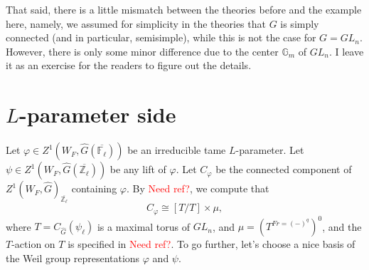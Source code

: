 That said, there is a little mismatch between the theories before and the example here, namely, we assumed for simplicity in the theories that $G$ is simply connected (and in particular, semisimple), while this is not the case for $G=GL_n$. However, there is only some minor difference due to the center $\mathbb{G}_m$ of $GL_n$. I leave it as an exercise for the readers to figure out the details.

\section{$L$-parameter side}
Let $\varphi \in Z^1(W_F, \hat{G}(\overline{\mathbb{F}_{\ell}}))$ be an irreducible tame $L$-parameter. Let $\psi \in Z^1(W_F, \hat{G}(\overline{\mathbb{Z}_{\ell}}))$ be any lift of $\varphi$. Let $C_{\varphi}$ be the connected component of $Z^1(W_F, \hat{G})_{\overline{\mathbb{Z}_{\ell}}}$ containing $\varphi$. By \textcolor{red}{Need ref?}, we compute that
$$C_{\varphi} \cong [T/T] \times \mu,$$
where $T=C_{\hat{G}}(\psi_{\ell})$ is a maximal torus of $GL_n$, and $\mu=(T^{Fr=(-)^q})^0$, and the $T$-action on $T$ is specified in \textcolor{red}{Need ref?}. To go further, let's choose a nice basis of the Weil group representations $\varphi$ and $\psi$.

